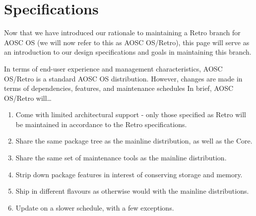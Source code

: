 


    \baselineskip=16pt
    \sloppy
    \raggedbottom
    \RaggedRight
    \overfullrule=10pt

    \makecoverpage

    \setcounter{tocdepth}{1}
    \sffamily{\tableofcontents}



    \pagestyle{plain}
    \rmfamily\mdseries\normalsize

    \chapter{Specifications}

    Now that we have introduced our rationale to maintaining a Retro branch for AOSC OS
    (we will now refer to this as AOSC OS/Retro), this page will serve as an introduction
    to our design specifications and goals in maintaining this branch.

    In terms of end-user experience and management characteristics, AOSC OS/Retro is a standard AOSC OS distribution.
    However, changes are made in terms of dependencies, features, and maintenance schedules
    In brief, AOSC OS/Retro will\ldots

    \begin{enumerate}
        \item Come with limited architectural support - only those specified
            as Retro will be maintained in accordance to the Retro specifications.
        \item Share the same package tree as the mainline distribution, as well as the Core.
        \item Share the same set of maintenance tools as the mainline distribution.
        \item Strip down package features in interest of conserving storage and memory.
        \item Ship in different flavours as otherwise would with the mainline distributions.
        \item Update on a slower schedule, with a few exceptions.
    \end{enumerate}

